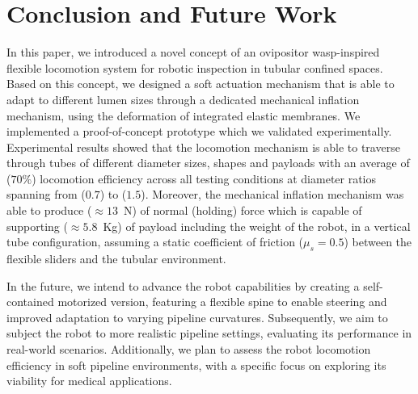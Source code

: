 \documentclass[letterpaper, 10 pt, conference]{ieeeconf}  %
\begin{document}
\section{Conclusion and Future Work}
In this paper, we introduced a novel concept of an ovipositor wasp-inspired flexible locomotion system for robotic inspection in tubular confined spaces. Based on this concept, we designed a soft actuation mechanism that is able to adapt to different lumen sizes through a dedicated mechanical inflation mechanism, using the deformation of integrated elastic membranes. We implemented a proof-of-concept prototype which we validated experimentally. Experimental results showed that the locomotion mechanism is able to traverse through tubes of different diameter sizes, shapes and payloads with an average of ($70\%$) locomotion efficiency across all testing conditions at diameter ratios spanning from ($0.7$) to ($1.5$). Moreover, the mechanical inflation mechanism was able to produce ($\approx13$~N) of normal (holding) force which is capable of supporting ($\approx5.8$~Kg) of payload including the weight of the robot, in a vertical tube configuration, assuming a static coefficient of friction ($\mu_{s}=0.5$) between the flexible sliders and the tubular environment. 

In the future, we intend to advance the robot capabilities by creating a self-contained motorized version, featuring a flexible spine to enable steering and improved adaptation to varying pipeline curvatures. Subsequently, we aim to subject the robot to more realistic pipeline settings, evaluating its performance in real-world scenarios. Additionally, we plan to assess the robot locomotion efficiency in soft pipeline environments, with a specific focus on exploring its viability for medical applications.










\end{document}
